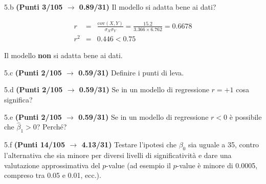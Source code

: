 \documentclass[
  11pt,
]{book}
\theoremstyle{mytheoremstyle}
\theoremstyle{mydefstyle}
\newenvironment{sol}
  {
  \begin{tcolorbox}[enhanced,breakable,arc=0.1mm,boxrule=1pt,colback=white,colframe=iblue,
  title=\bf \fontfamily{lmss}\selectfont \hspace{.5 cm} Soluzione,drop fuzzy shadow]

}{
\end{tcolorbox}
  }
\begin{document}
5.b \textbf{(Punti 3/105 \(\rightarrow\) 0.89/31)} Il modello si adatta bene ai dati?

\begin{sol}
\begin{eqnarray*}
r&=&\frac{\text{cov}(X,Y)}{\sigma_X\sigma_Y}=\frac{ 15.2 }{ 3.366 \times 6.762 }= 0.6678 \\ 
r^2&=& 0.446 < 0.75
\end{eqnarray*}

Il modello \textbf{non} si adatta bene ai dati.

\end{sol}

5.c \textbf{(Punti 2/105 \(\rightarrow\) 0.59/31)} Definire i punti di leva.

5.d \textbf{(Punti 2/105 \(\rightarrow\) 0.59/31)} Se in un modello di regressione \(r=+1\) cosa significa?

5.e \textbf{(Punti 2/105 \(\rightarrow\) 0.59/31)} Se in un modello di regressione \(r<0\) è possibile che \(\hat\beta_1>0\)? Perché?

5.f \textbf{(Punti 14/105 \(\rightarrow\) 4.13/31)} Testare l'ipotesi che \(\beta_0\) sia uguale a 35, contro l'alternativa che sia minore per diversi livelli di significatività e dare una valutazione approssimativa del \(p\)-value (ad esempio il \(p\)-value è minore di 0.0005, compreso tra 0.05 e 0.01, ecc.).
\end{document}
